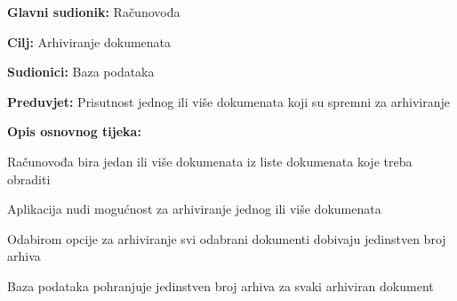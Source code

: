 			\noindent {}
			\begin{packed_item}
				
				\item \textbf{Glavni sudionik: }Računovođa
				\item  \textbf{Cilj:} Arhiviranje dokumenata
				\item  \textbf{Sudionici:} Baza podataka
				\item  \textbf{Preduvjet:} Prisutnost jednog ili više dokumenata koji su spremni za arhiviranje
				\item  \textbf{Opis osnovnog tijeka:}
				
				\item[] \begin{packed_enum}
					
					\item Računovođa bira jedan ili više dokumenata iz liste dokumenata koje treba obraditi 
					\item Aplikacija nudi mogućnost za arhiviranje jednog ili više dokumenata
					\item Odabirom opcije za arhiviranje svi odabrani dokumenti dobivaju jedinstven broj arhiva
					\item Baza podataka pohranjuje jedinstven broj arhiva za svaki arhiviran dokument
					
				\end{packed_enum}
			\end{packed_item}
			
